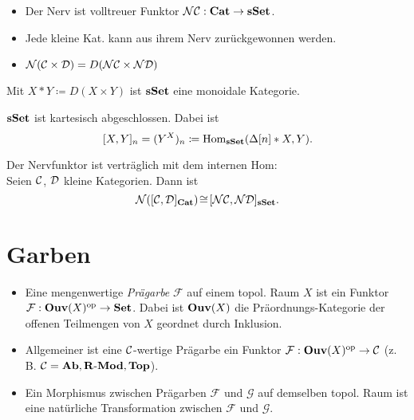 \documentclass{cheat-sheet}
\newcommand{\Fais}{\mathcal{F}} %
\newcommand{\Garb}{\mathcal{G}} %
\newcommand{\NCat}{\mathcal{NC}} %
\newcommand{\Nerve}{\mathcal{N}} %
\begin{document}
\begin{samepage}
\begin{bem}
  \begin{itemize}
    \item Der Nerv ist volltreuer Funktor $\NCat : \CatC \to \sSet$.
    \item Jede kleine Kat. kann aus ihrem Nerv zurückgewonnen werden.
    \item $\Nerve(\Cat \times \Dat) = D(\Nerve\Cat \times \Nerve\Dat)$
  \end{itemize}
\end{bem}

\begin{bem}
  Mit $X \!*\! Y \coloneqq D(X \!\times\! Y)$ ist $\mathbf{sSet}$ eine monoidale Kategorie.
\end{bem}

\begin{prop}
  $\mathbf{sSet}$ ist kartesisch abgeschlossen. Dabei ist
  \[ [X, Y]_n = (Y^X)_n \coloneqq \operatorname{Hom}_{\mathbf{sSet}}(\Delta[n] * X, Y). \]
\end{prop}

\begin{prop}
  Der Nervfunktor ist verträglich mit dem internen Hom: \\
  Seien $\mathcal{C}$, $\mathcal{D}$ kleine Kategorien. Dann ist
  \[ \Nerve([\Cat, \Dat]_{\CatC}) \!\cong\! [\Nerve\Cat, \Nerve\Dat]_{\sSet}. \]
\end{prop}

\section{Garben}

\end{samepage}



\begin{defn}
  \begin{itemize}
    \item Eine mengenwertige \emph{Prägarbe} $\Fais$ auf einem topol. Raum $X$ ist ein Funktor
    $\Fais : \Ouv(X)^\op \to \SetC$.
    Dabei ist $\mathbf{Ouv}(X)$ die Präordnungs-Kategorie der offenen Teilmengen von $X$ geordnet durch Inklusion.
    \item Allgemeiner ist eine $\mathcal{C}$-wertige Prägarbe ein Funktor $\Fais : \Ouv(X)^\op \to \Cat$ (z.\,B. $\mathcal{C} = \mathbf{Ab}, \mathbf{R\text{-}Mod}, \mathbf{Top}$).
    \item Ein Morphismus zwischen Prägarben $\Fais$ und $\Garb$ auf demselben topol. Raum ist eine natürliche Transformation zwischen $\Fais$ und $\Garb$.
  \end{itemize}
\end{defn}
\end{document}
